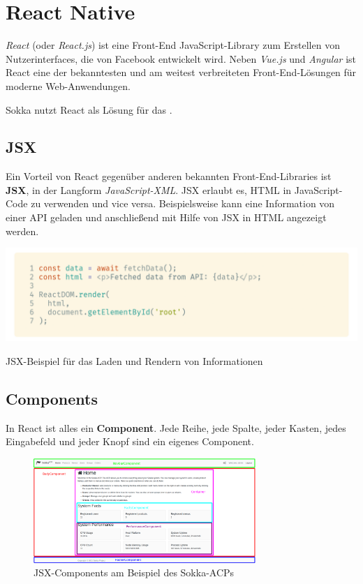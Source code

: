 \section{React Native}

\textit{React} (oder \textit{React.js}) ist eine Front-End JavaScript-Library zum Erstellen von Nutzerinterfaces, die von Facebook entwickelt wird. Neben \textit{Vue.js} und \textit{Angular} ist React eine der bekanntesten und am weitest verbreiteten Front-End-Lösungen für moderne Web-Anwendungen. \cite{nadafkhanrathod2020}

Sokka nutzt React als Lösung für das .

\subsection{JSX}

Ein Vorteil von React gegenüber anderen bekannten Front-End-Libraries ist \textbf{JSX}, in der Langform \textit{JavaScript-XML}. JSX erlaubt es, HTML in JavaScript-Code zu verwenden und vice versa. Beispielsweise kann eine Information von einer API geladen und anschließend mit Hilfe von JSX in HTML angezeigt werden.

\begin{code}[h]
    \centering
    \includegraphics[width=1\textwidth]{images/React/jsx.png}
    \vspace{-25pt}
    \caption{JSX-Beispiel für das Laden und Rendern von Informationen}
\end{code}

\subsection{Components}

In React ist alles ein \textbf{Component}. Jede Reihe, jede Spalte, jeder Kasten, jedes Eingabefeld und jeder Knopf sind ein eigenes Component.

\begin{figure}[h]
    \begin{center}
        \includegraphics[width=0.75\textwidth]{images/React/components.png}
        \caption{JSX-Components am Beispiel des Sokka-ACPs}
    \end{center}
\end{figure}

